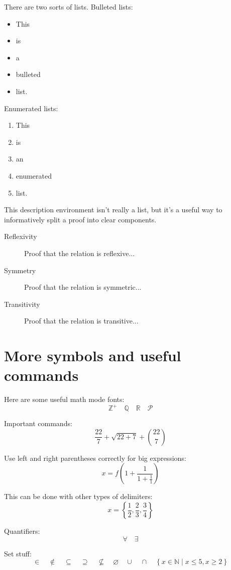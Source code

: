 \documentclass[12pt,letterpaper]{article}
\begin{document}
There are two sorts of lists.
Bulleted lists:
\begin{itemize}
    \item This
    \item is
    \item a
    \item bulleted
    \item list.
\end{itemize}

Enumerated lists:
\begin{enumerate}
    \item This 
    \item is
    \item an
    \item enumerated
    \item list.
\end{enumerate}

This description environment isn't really a list, 
but it's a useful way to
informatively split a proof into clear
components.
\begin{description}
\item[Reflexivity]
Proof that the relation is reflexive...

\item[Symmetry]
Proof that the relation is symmetric...

\item[Transitivity]
Proof that the relation is transitive...
\end{description}

\section{More symbols and useful commands}

Here are some useful math mode fonts:
\[
\mathbb{Z}^{+} \quad \mathbb{Q} \quad \mathbb{R} \quad \mathcal{P}
\]

Important commands:
\[
\frac{22}{7} + \sqrt{22 + 7} + \binom{22}{7}
\]

Use left and right parentheses correctly for big expressions:
\[
x = f\left( 1 + \frac{1}{1 + \frac{1}{1}}\right)
\]

This can be done with other types of delimiters:
\[
x = \left\{ \frac{1}{2}, \frac{2}{3}, \frac{3}{4} \right\}
\]

Quantifiers:
\[
\forall \quad \exists
\]

Set stuff:
\[
\in \quad \notin \quad \subseteq \quad \supseteq \quad
\nsubseteq \quad \varnothing \quad
\cup \quad \cap \quad 
\left\{x \in \mathbb{N} \mid x \leq 5, x \geq 2 \right\}
\]
\end{document}
